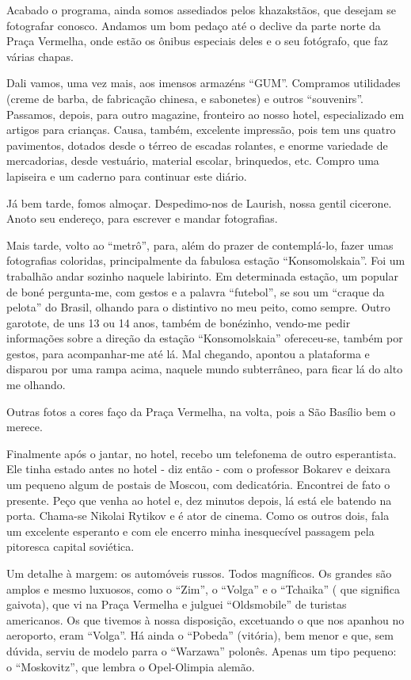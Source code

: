 Acabado o programa, ainda somos assediados pelos khazakstãos, que desejam se fotografar conosco. Andamos um bom pedaço até o declive da parte norte da Praça Vermelha, onde estão os ônibus especiais deles e o seu fotógrafo, que faz várias chapas.

Dali vamos, uma vez mais, aos imensos armazéns “GUM”. Compramos utilidades (creme de barba, de fabricação chinesa, e sabonetes) e outros “souvenirs”. Passamos, depois, para outro magazine, fronteiro ao nosso hotel, especializado em artigos para crianças. Causa, também, excelente impressão, pois tem uns quatro pavimentos, dotados desde o térreo de escadas rolantes, e enorme variedade de mercadorias, desde vestuário, material escolar, brinquedos, etc. Compro uma lapiseira e um caderno para continuar este diário.

Já bem tarde, fomos almoçar. Despedimo-nos de Laurish, nossa gentil cicerone. Anoto seu endereço, para escrever e mandar fotografias.

Mais tarde, volto ao “metrô”, para, além do prazer de contemplá-lo, fazer umas fotografias coloridas, principalmente da fabulosa estação “Konsomolskaia”. Foi um trabalhão andar sozinho naquele labirinto. Em determinada estação, um popular de boné pergunta-me, com gestos e a palavra “futebol”, se sou um “craque da pelota” do Brasil, olhando para o distintivo no meu peito, como sempre. Outro garotote, de uns 13 ou 14 anos, também de bonézinho, vendo-me pedir informações sobre a direção da estação “Konsomolskaia” ofereceu-se, também por gestos, para acompanhar-me até lá. Mal chegando, apontou a plataforma e disparou por uma rampa acima, naquele mundo subterrâneo, para ficar lá do alto me olhando.

Outras fotos a cores faço da Praça Vermelha, na volta, pois a São Basílio bem o merece.

Finalmente após o jantar, no hotel, recebo um telefonema de outro esperantista. Ele tinha estado antes no hotel - diz então - com o professor Bokarev e deixara um pequeno algum de postais de Moscou, com dedicatória. Encontrei de fato o presente. Peço que venha ao hotel e, dez minutos depois, lá está ele batendo na porta. Chama-se Nikolai Rytikov e é ator de cinema. Como os outros dois, fala um excelente esperanto e com ele encerro minha inesquecível passagem pela pitoresca capital soviética.

Um detalhe à margem: os automóveis russos. Todos magníficos. Os grandes são amplos e mesmo luxuosos, como o “Zim”, o “Volga” e o “Tchaika” ( que significa gaivota), que vi na Praça Vermelha e julguei “Oldsmobile” de turistas americanos. Os que tivemos à nossa disposição, excetuando o que nos apanhou no aeroporto, eram “Volga”. Há ainda o “Pobeda” (vitória), bem menor e que, sem dúvida, serviu de modelo parra o “Warzawa” polonês. Apenas um tipo pequeno: o “Moskovitz”, que lembra o Opel-Olimpia alemão.

